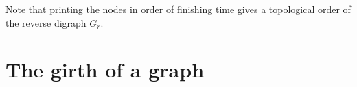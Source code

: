 Note that printing the nodes in order of
finishing time gives a topological order of the reverse digraph $G_r$.

%
%
%
%
%
%
%
%
%
%

\section{The girth of a graph}
\label{sec:girth}

